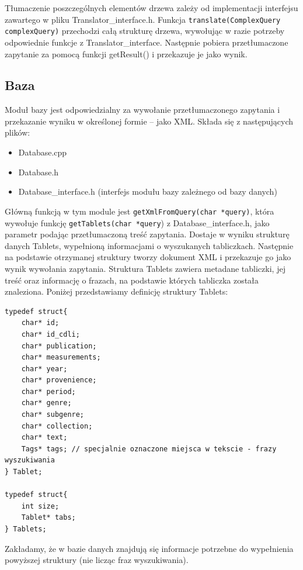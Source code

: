 Tłumaczenie poszczególnych elementów drzewa zależy od implementacji interfejsu zawartego w pliku Translator\_interface.h. 
Funkcja \verb|translate(ComplexQuery complexQuery)| przechodzi całą strukturę drzewa, wywołując w razie 
potrzeby odpowiednie funkcje z Translator\_interface.
Następnie pobiera przetłumaczone zapytanie za pomocą funkcji getResult() i przekazuje je jako wynik.

\subsection{Baza}
Moduł bazy jest odpowiedzialny za wywołanie przetłumaczonego zapytania i przekazanie wyniku w określonej formie -- jako XML.
Składa się z następujących plików:
\begin {itemize}
 \item Database.cpp
 \item Database.h
 \item Database\_interface.h (interfejs modułu bazy zależnego od bazy danych)
\end {itemize}

Główną funkcją w tym module jest \verb|getXmlFromQuery(char *query)|, która
wywołuje funkcję \verb|getTablets(char *query|) z Database\_interface.h, jako parametr podając przetłumaczoną treść zapytania. 
Dostaje w wyniku strukturę danych Tablets, wypełnioną informacjami o wyszukanych tabliczkach.
Następnie na podstawie otrzymanej struktury tworzy dokument XML i przekazuje go jako wynik wywołania zapytania.
\newline
Struktura Tablets zawiera metadane tabliczki, jej treść oraz informację o frazach, na podstawie których tabliczka została znaleziona. 
Poniżej przedstawiamy definicję struktury Tablets:
\begin{verbatim}
typedef struct{    
    char* id;
    char* id_cdli;
    char* publication;
    char* measurements;
    char* year;
    char* provenience;
    char* period;
    char* genre;
    char* subgenre;
    char* collection;
    char* text;
    Tags* tags; // specjalnie oznaczone miejsca w tekscie - frazy wyszukiwania
} Tablet;

typedef struct{
    int size;
    Tablet* tabs;
} Tablets;
\end{verbatim}

Zakładamy, że w bazie danych znajdują się informacje potrzebne do wypełnienia powyższej struktury (nie licząc fraz wyszukiwania).

